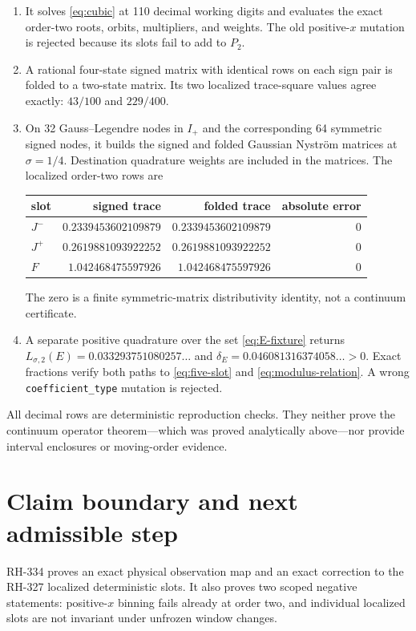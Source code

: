 \documentclass[11pt]{article}
\theoremstyle{remark}
\begin{document}
\begin{enumerate}[leftmargin=2.2em]
\item It solves \eqref{eq:cubic} at 110 decimal working digits and evaluates
the exact order-two roots, orbits, multipliers, and weights.  The old
positive-$x$ mutation is rejected because its slots fail to add to $P_2$.
\item A rational four-state signed matrix with identical rows on each sign
pair is folded to a two-state matrix.  Its two localized trace-square values
agree exactly: $43/100$ and $229/400$.
\item On 32 Gauss--Legendre nodes in $I_+$ and the corresponding 64 symmetric
signed nodes, it builds the signed and folded Gaussian Nystr\"om matrices at
$\sigma=1/4$.  Destination quadrature weights are included in the matrices.
The localized order-two rows are
\begin{center}\small
\begin{tabular}{lrrr}
\toprule
slot & signed trace & folded trace & absolute error\\
\midrule
$J^-$ & $0.2339453602109879$ & $0.2339453602109879$ & $0$\\
$J^+$ & $0.2619881093922252$ & $0.2619881093922252$ & $0$\\
$F$   & $1.042468475597926$ & $1.042468475597926$ & $0$\\
\bottomrule
\end{tabular}
\end{center}
The zero is a finite symmetric-matrix distributivity identity, not a
continuum certificate.
\item A separate positive quadrature over the set \eqref{eq:E-fixture}
returns $L_{\sigma,2}(E)=0.033293751080257\ldots$ and
$\delta_E=0.046081316374058\ldots>0$.  Exact fractions verify both paths to
\eqref{eq:five-slot} and \eqref{eq:modulus-relation}.  A wrong
\texttt{coefficient\_type} mutation is rejected.
\end{enumerate}

All decimal rows are deterministic reproduction checks.  They neither prove
the continuum operator theorem---which was proved analytically above---nor
provide interval enclosures or moving-order evidence.

\section{Claim boundary and next admissible step}

RH-334 proves an exact physical observation map and an exact correction to
the RH-327 localized deterministic slots.  It also proves two scoped negative
statements: positive-$x$ binning fails already at order two, and individual
localized slots are not invariant under unfrozen window changes.
\end{document}
